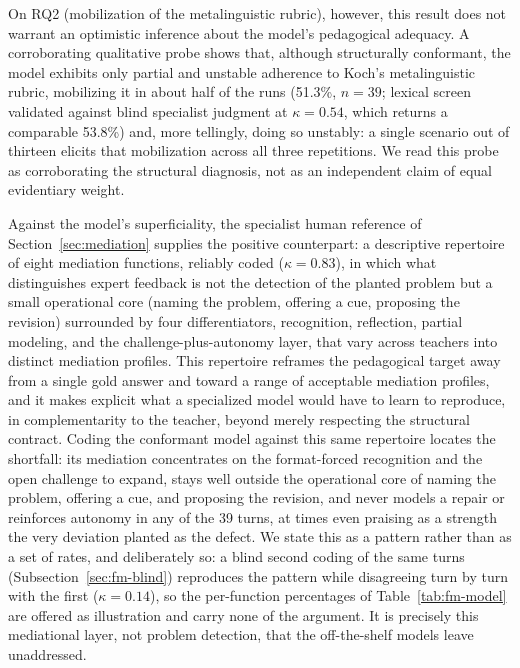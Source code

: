 \documentclass{sbc2023}%
\begin{document}
On RQ2 (mobilization of the metalinguistic rubric), however, this result does not warrant an optimistic inference about the model's pedagogical adequacy. A corroborating qualitative probe shows that, although structurally conformant, the model exhibits only partial and unstable adherence to Koch's metalinguistic rubric, mobilizing it in about half of the runs (51.3\%, $n=39$; lexical screen validated against blind specialist judgment at $\kappa = 0.54$, which returns a comparable 53.8\%) and, more tellingly, doing so unstably: a single scenario out of thirteen elicits that mobilization across all three repetitions. We read this probe as corroborating the structural diagnosis, not as an independent claim of equal evidentiary weight.

Against the model's superficiality, the specialist human reference of Section~\ref{sec:mediation} supplies the positive counterpart: a descriptive repertoire of eight mediation functions, reliably coded ($\kappa = 0.83$), in which what distinguishes expert feedback is not the detection of the planted problem but a small operational core (naming the problem, offering a cue, proposing the revision) surrounded by four differentiators, recognition, reflection, partial modeling, and the challenge-plus-autonomy layer, that vary across teachers into distinct mediation profiles. This repertoire reframes the pedagogical target away from a single gold answer and toward a range of acceptable mediation profiles, and it makes explicit what a specialized model would have to learn to reproduce, in complementarity to the teacher, beyond merely respecting the structural contract. Coding the conformant model against this same repertoire locates the shortfall: its mediation concentrates on the format-forced recognition and the open challenge to expand, stays well outside the operational core of naming the problem, offering a cue, and proposing the revision, and never models a repair or reinforces autonomy in any of the 39 turns, at times even praising as a strength the very deviation planted as the defect. We state this as a pattern rather than as a set of rates, and deliberately so: a blind second coding of the same turns (Subsection~\ref{sec:fm-blind}) reproduces the pattern while disagreeing turn by turn with the first ($\kappa = 0.14$), so the per-function percentages of Table~\ref{tab:fm-model} are offered as illustration and carry none of the argument. It is precisely this mediational layer, not problem detection, that the off-the-shelf models leave unaddressed.
\end{document}
